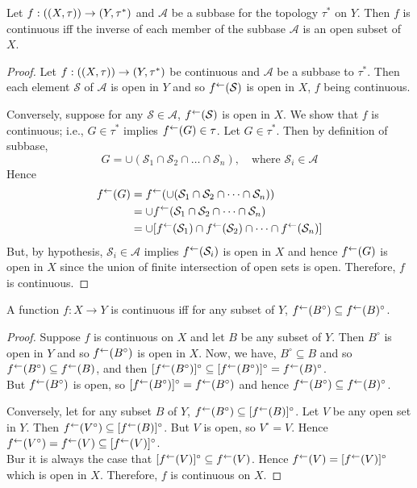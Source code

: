 \documentclass[../main-sheet.tex]{subfiles}
\begin{document}
\begin{thm}
    Let \(f:((X, \tau))\to(Y,\tau^{*})\) and \(\mathcal{A}\) be a subbase for the topology \(\tau^{*}\) on \(Y\). Then \(f\) is continuous iff the inverse of each member of the subbase \(\mathcal{A}\) is an open subset of \(X\).
\end{thm}
\begin{proof}
    Let \(f:((X, \tau))\to(Y,\tau^{*})\) be continuous and \(\mathcal{A} \) be a subbase to \(\tau^{*}\). Then each element \(\mathcal{S}\) of \(\mathcal{A}\) is open in \(Y\) and so \(f^{\leftarrow}(\mathcal{S})\) is open in \(X\), \(f\) being continuous.

    Conversely, suppose for any \(\mathcal{S}\in \mathcal{A}\), \(f^{\leftarrow}(\mathcal{S})\) is open in \(X\). We show that \(f\) is continuous; i.e., \(G\in \tau^{*}\) implies \(f^{\leftarrow}(G)\in\tau\). Let \(G\in\tau^{*}\). Then by definition of subbase,
    \[G=\cup(\mathcal{S}_1\cap\mathcal{S}_2\cap \dots\cap\mathcal{S}_n),\quad \text{where } \mathcal{S}_i\in \mathcal{A}\]
    Hence 
    \begin{align*}
        f^{\leftarrow}(G)&=f^{\leftarrow}(\cup(\mathcal{S}_1\cap\mathcal{S}_2\cap \dots\cap\mathcal{S}_n))\\
        &=\cup f^{\leftarrow}(\mathcal{S}_1\cap\mathcal{S}_2\cap \dots\cap\mathcal{S}_n)\\
        &=\cup[f^{\leftarrow}(\mathcal{S}_1)\cap f^{\leftarrow}(\mathcal{S}_2)\cap \dots\cap f^{\leftarrow}(\mathcal{S}_n)]
    \end{align*}
    But, by hypothesis, \(\mathcal{S}_i\in \mathcal{A}\) implies \(f^{\leftarrow}(\mathcal{S}_i)\) is open in \(X\) and hence \(f^{\leftarrow}(G)\) is open in \(X\) since the union of finite intersection of open sets is open. Therefore, \(f\) is continuous.
\end{proof}
\begin{thm}
    A function \(f:X\to Y\) is continuous iff for any subset of \(Y\), \(f^{\leftarrow}(B^{\circ})\subseteq f^{\leftarrow}(B)^{\circ}\).
\end{thm}
\begin{proof}
    Suppose \(f\) is continuous on \(X\) and let \(B\) be any subset of \(Y\). Then \(B^{\circ}\) is open in \(Y\) and so \(f^{\leftarrow}(B^{\circ})\) is open in \(X\). Now, we have, \(B^{\circ}\subseteq B\) and so \(f^{\leftarrow}(B^{\circ})\subseteq f^{\leftarrow}(B)\), and then \([f^{\leftarrow}(B^{\circ})]^{\circ}\subseteq [f^{\leftarrow}(B^{\circ})]^{\circ}=f^{\leftarrow}(B)^{\circ}\).\\
    But \(f^{\leftarrow}(B^{\circ})\) is open, so \([f^{\leftarrow}(B^{\circ})]^{\circ}=f^{\leftarrow}(B^{\circ})\) and hence \(f^{\leftarrow}(B^{\circ})\subseteq f^{\leftarrow}(B)^{\circ}\).

    Conversely, let for any subset \(B\) of \(Y\), \(f^{\leftarrow}(B^{\circ})\subseteq [f^{\leftarrow}(B)]^{\circ}\). Let \(V\) be any open set in \(Y\). Then \(f^{\leftarrow}(V^{\circ})\subseteq[f^{\leftarrow}(B)]^{\circ}\). But \(V\) is open, so \(V^{\circ}=V\). Hence \(f^{\leftarrow}(V^{\circ})=f^{\leftarrow}(V)\subseteq[f^{\leftarrow}(V)]^{\circ}\).\\
    Bur it is always the case that \([f^{\leftarrow}(V)]^{\circ}\subseteq f^{\leftarrow}(V)\). Hence \(f^{\leftarrow}(V)=[f^{\leftarrow}(V)]^{\circ}\) which is open in \(X\). Therefore, \(f\) is continuous on \(X\).
\end{proof}
\end{document}
